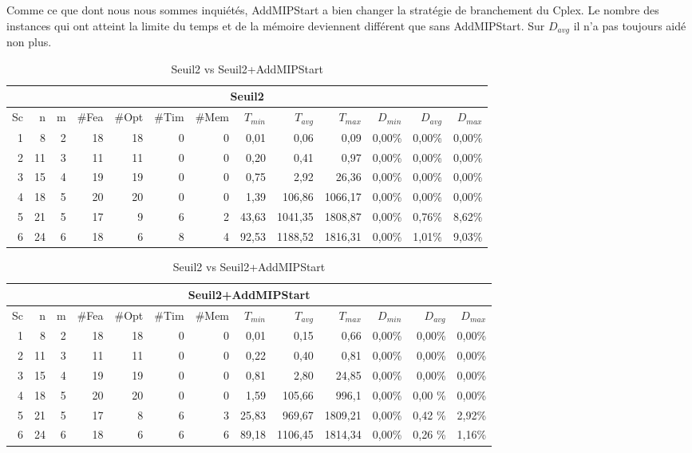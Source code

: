 Comme ce que dont nous nous sommes inquiétés, AddMIPStart a bien changer la stratégie de branchement du Cplex. Le nombre des instances qui ont atteint la limite du temps et de la mémoire deviennent différent que sans AddMIPStart. Sur $D_{avg}$ il n'a pas toujours aidé non plus.
\begin{table}[h]
    \centering
    \begin{tabular}{|r|r|r|r|r|r|r|r|r|r|r|r|r|}
    	\hline
    	\multicolumn{13}{|c|}{Seuil2}\\ \hline
Sc &	n	&m	&\#Fea	&\#Opt	&\#Tim &\#Mem	&$T_{min}$ & $T_{avg}$	& $T_{max}$ & $D_{min}$ & $D_{avg}$	& $D_{max}$ \\ \hline
1&	8 &	2&	18&	18&	0&	0&	0,01&	0,06&	0,09	&0,00\%&	0,00\%&	0,00\%    \\ \hline
2&	11&	3&	11&	11&	0&	0&	0,20&	0,41&	0,97	&0,00\%&	0,00\%&	0,00\%     \\ \hline
3&	15&	4&	19&	19&	0&	0&	0,75&	2,92&	26,36	&0,00\%&	0,00\%&	0,00\%  \\ \hline
4 &	18	&5	&20	&20	&0	&0	&1,39	&106,86	    &1066,17	&0,00\%&	0,00\%&	0,00\% \\ \hline
5 &	21	&5	&17	&9	&6	&2	&43,63	&1041,35	&1808,87	&0,00\%&	0,76\%&	8,62\% \\ \hline
6 &	24	&6	&18	&6	&8	&4	&92,53	&1188,52	&1816,31	&0,00\%&	1,01\%&	9,03\% \\ \hline
    \end{tabular}
\medskip \par
    \begin{tabular}{|r|r|r|r|r|r|r|r|r|r|r|r|r|}
    	\hline
    	\multicolumn{13}{|c|}{Seuil2+AddMIPStart}\\ \hline
Sc &	n	&m	&\#Fea	&\#Opt	&\#Tim &\#Mem	&$T_{min}$ & $T_{avg}$	& $T_{max}$ & $D_{min}$ & $D_{avg}$	& $D_{max}$ \\ \hline
1&	8 &	2&	18&	18&	0&	0&	0,01&	0,15&	0,66	&0,00\%&	0,00\%&	0,00\%    \\ \hline
2&	11&	3&	11&	11&	0&	0&	0,22&	0,40&	0,81	&0,00\%&	0,00\%&	0,00\%     \\ \hline
3&	15&	4&	19&	19&	0&	0&	0,81&	2,80&	24,85	&0,00\%&	0,00\%&	0,00\%  \\ \hline
4 &	18	&5	&20	&20	&0	&0	&1,59	&105,66	   & 996,1	&   0,00\%&	0,00	\%&0,00\% \\ \hline
5 &	21	&5	&17	&8	&6	&3	&25,83	&969,67	   & 1809,21&	0,00\%&	0,42	\%&2,92\% \\ \hline
6 &	24	&6	&18	&6	&6	&6	&89,18	&1106,45	&1814,34&	0,00\%&	0,26	\%&1,16\% \\ \hline
    \end{tabular} 
    \caption{Seuil2 vs Seuil2+AddMIPStart}
    \label{tab_cut2_ams2_tab2}
\end{table}
\bigskip


